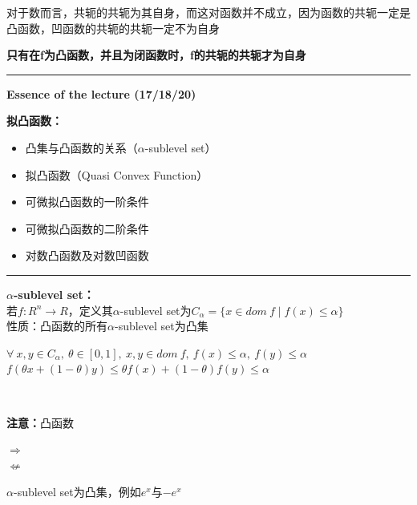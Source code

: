 \documentclass[11pt]{ctexart}         %
\newcommand{\oneline}[1][12pt]{\vspace{#1}}
\newcommand{\premise}[1][dom\ f]{\forall\ x,y\in #1,\ \theta\in [0,1]}
\newcommand{\linearcombine}[2]{\theta #1+(1-\theta)#2}
\newcommand{\rs}[2][R]{#1^{#2}} %
\newcommand{\li}[3][例]{
	#1：#2\\ 
	\phantom{#1：}\begin{minipage}[t]{0.9\linewidth}%
	\setlength\parskip{12pt}
	#3
	\end{minipage}
	\oneline}
\begin{document}
对于数而言，共轭的共轭为其自身，而这对函数并不成立，因为函数的共轭一定是凸函数，凹函数的共轭的共轭一定不为自身

{\color{red}\textbf{只有在f为凸函数，并且为闭函数时，f的共轭的共轭才为自身}}

\newpage
\hrule height 4pt
\begin{Large}
	\textbf{Essence of the lecture (17/18/20)}\\
\end{Large}
\begin{large}
	\textbf{拟凸函数：} 
\end{large}
\vspace{-16pt}
\begin{itemize} \setlength{\itemsep}{0pt}
	\item 凸集与凸函数的关系（$\alpha$-sublevel set）
	\item 拟凸函数（Quasi Convex Function）
	\item 可微拟凸函数的一阶条件
	\item 可微拟凸函数的二阶条件
	\item 对数凸函数及对数凹函数
\end{itemize}
\hrule height 4pt

\textbf{$\alpha$-sublevel set：}\\
若$f:\rs{n}\to R$，定义其$\alpha$-sublevel set为$C_\alpha=\{x\in dom\ f\mid f(x)\leq\alpha\}$\\
\li[性质]{凸函数的所有$\alpha$-sublevel set为凸集}{$\premise[C_\alpha],\ x,y\in dom\ f,\ f(x)\leq \alpha,\ f(y)\leq \alpha$\\
$f(\linearcombine{x}{y})\leq \linearcombine{f(x)}{f(y)}\leq \alpha$}\\
{\color{red}\textbf{注意：}凸函数 \parbox{1em}{$ \Rightarrow $\\ [-10pt] $ \nLeftarrow $} $\alpha$-sublevel set为凸集，例如$ e^x $与$ -e^x $}
\end{document}
